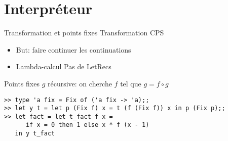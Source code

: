 \documentclass[10pt]{beamer}
\begin{document}
\section{Interpréteur}




\begin{frame}[fragile]{Transformation et points fixes}
Transformation CPS
\begin{itemize}
\item But: faire continuer les continuations
\item Lambda-calcul \alert{Pas de LetRecs}
\end{itemize}

\begin{block}{Points fixes}
$g$ récursive: on cherche $f$ tel que $g = f \circ g$
\end{block}

\begin{verbatim}
>> type 'a fix = Fix of ('a fix -> 'a);;
>> let y t = let p (Fix f) x = t (f (Fix f)) x in p (Fix p);;
>> let fact = let t_fact f x = 
      if x = 0 then 1 else x * f (x - 1) 
   in y t_fact
\end{verbatim}
\end{frame}
 
\end{document}
